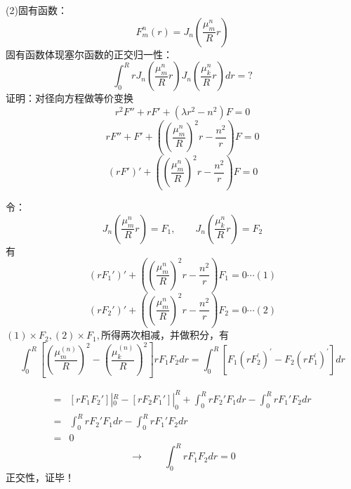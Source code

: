 \begin{frame}
	(2)固有函数：\[F_m ^n(r) = J_n (\frac{\mu_{m}^{n}}{R}r) \]
	固有函数体现塞尔函数的正交归一性：
	\begin{equation*}
		\int_0 ^R r J_n (\frac{\mu_{m}^{n}}{R}r) J_n (\frac{\mu_{k}^{n}}{R}r) dr =?
	\end{equation*}
	\alert{证明：}对径向方程做等价变换
	\begin{equation*}
		r^2 F''+r F' +(\lambda r^2 -n^2)F=0 
	\end{equation*}	
	\begin{equation*}
		r F''+ F' +((\frac{\mu_{m}^{n}}{R})^2 r -\frac{n^2}{r})F=0  
	\end{equation*}	
	\begin{equation*}
		(r F')' +((\frac{\mu_{m}^{n}}{R})^2 r -\frac{n^2}{r})F=0  
	\end{equation*}	
\end{frame}	

\begin{frame}
	令：\[J_n (\frac{\mu_{m}^{n}}{R}r)=F_1, \qquad J_n (\frac{\mu_{k}^{n}}{R}r) =F_2\]
	有
	\begin{equation*}
		(r F_1')' +((\frac{\mu_{m}^{n}}{R})^2 r -\frac{n^2}{r})F_1=0  \cdots (1)
	\end{equation*}	 
	\begin{equation*}
		(r F_2')' +((\frac{\mu_{m}^{n}}{R})^2 r -\frac{n^2}{r})F_2=0  \cdots (2) 
	\end{equation*}	
	$(1)\times F_2,  (2)\times F_1,$所得两次相减，并做积分，有
	\begin{equation*}	
		\int_0 ^R \left[\left(\frac{\mu_{m}^{(n)}}{R}\right)^{2}-\left(\frac{\mu_{k}^{(n)}}{R}\right)^{2}\right] r F_{1} F_{2} dr 
		=\int_0 ^R  [F_{1}\left(r F_{2}^{\prime}\right)^{\prime}-F_{2}\left(r F_{1}^{\prime}\right)^{\prime}] dr
	\end{equation*}
\end{frame}	

\begin{frame}
	\begin{equation*}
		\begin{split}
			=& [rF_1F_2']|_0 ^R - [rF_2F_1']|_0 ^R + \int_0 ^R rF_2'F_1 dr - \int_0 ^R rF_1'F_2 dr\\
			=& \int_0 ^R rF_2'F_1 dr - \int_0 ^R rF_1'F_2 dr\\
			=& 0
		\end{split}
	\end{equation*}	
	\begin{equation*}	
		\to \qquad	\int_0 ^R r F_{1} F_{2} dr = 0
	\end{equation*}
	正交性，\alert{证毕！}
\end{frame}	

